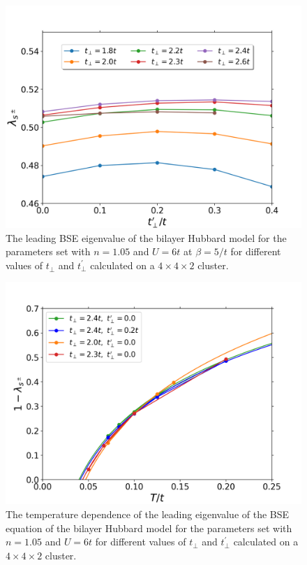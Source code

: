 \documentclass[prb,twocolumn,amsmath,amssymb,superscriptaddress,floatfix,nofootinbib]{revtex4-2}
\begin{document}
 \begin{figure}
\centering
\includegraphics[scale=0.43]{Lambda0_U6_n0pt95_bt5_vary_tp_tpp.png}
\caption{The leading BSE eigenvalue of the bilayer Hubbard model for the parameters set with $n=1.05$ and $U=6t$ at $\beta= 5/t$ for different values of $t^{\phantom\dagger}_{\perp}$ and $t_{\perp}^{\prime}$ calculated on a $4\times 4\times 2$ cluster. }
\label{fig:lambdatperpprime3}
\end{figure}

 
 
 \begin{figure}
\centering
\includegraphics[width=\columnwidth]{Lambda0_U6_n0pt95_vary_tp_tpp_temp.png}
\caption{The temperature dependence of the leading eigenvalue of the BSE equation of the bilayer Hubbard model for the parameters set with $n=1.05$ and $U=6t$ for different values of $t^{\phantom\prime}_{\perp}$ and $t_{\perp}^{\prime}$ calculated on a $4\times 4\times 2$ cluster.  }
\label{fig:lambdavsT_n0.95}
\end{figure}
\end{document}
